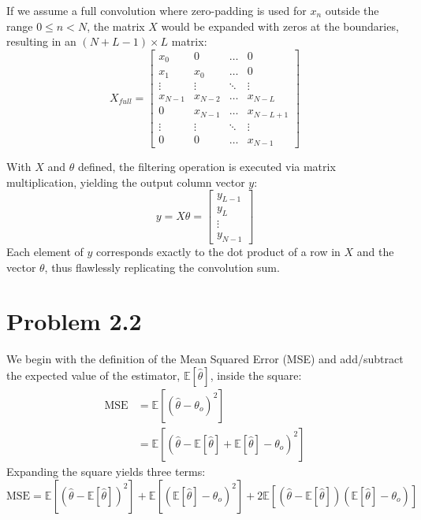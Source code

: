 \documentclass[11pt, a4paper]{article}
\begin{document}
If we assume a full convolution where zero-padding is used for $x_n$ outside the range $0 \le n < N$, the matrix $X$ would be expanded with zeros at the boundaries, resulting in an $(N + L - 1) \times L$ matrix:
\begin{equation}
    X_{full} = 
    \begin{bmatrix}
        x_0    & 0       & \dots  & 0 \\
        x_1    & x_0     & \dots  & 0 \\
        \vdots & \vdots  & \ddots & \vdots \\
        x_{N-1}& x_{N-2} & \dots  & x_{N-L} \\
        0      & x_{N-1} & \dots  & x_{N-L+1} \\
        \vdots & \vdots  & \ddots & \vdots \\
        0      & 0       & \dots  & x_{N-1}
    \end{bmatrix}
\end{equation}

With $X$ and $\theta$ defined, the filtering operation is executed via matrix multiplication, yielding the output column vector $y$:
\begin{equation}
    y = X\theta = 
    \begin{bmatrix}
        y_{L-1} \\
        y_{L} \\
        \vdots \\
        y_{N-1}
    \end{bmatrix}
\end{equation}
Each element of $y$ corresponds exactly to the dot product of a row in $X$ and the vector $\theta$, thus flawlessly replicating the convolution sum.

\section*{Problem 2.2}
We begin with the definition of the Mean Squared Error (MSE) and add/subtract the expected value of the estimator, $\mathbb{E}[\hat{\theta}]$, inside the square:
\begin{align}
    \text{MSE} &= \mathbb{E}\left[(\hat{\theta} - \theta_o)^2\right] \nonumber \\
    &= \mathbb{E}\left[(\hat{\theta} - \mathbb{E}[\hat{\theta}] + \mathbb{E}[\hat{\theta}] - \theta_o)^2\right]
\end{align}
Expanding the square yields three terms:
\begin{equation}
    \text{MSE} = \mathbb{E}\left[(\hat{\theta} - \mathbb{E}[\hat{\theta}])^2\right] + \mathbb{E}\left[(\mathbb{E}[\hat{\theta}] - \theta_o)^2\right] + 2\mathbb{E}\left[(\hat{\theta} - \mathbb{E}[\hat{\theta}])(\mathbb{E}[\hat{\theta}] - \theta_o)\right]
\end{equation}
\end{document}
